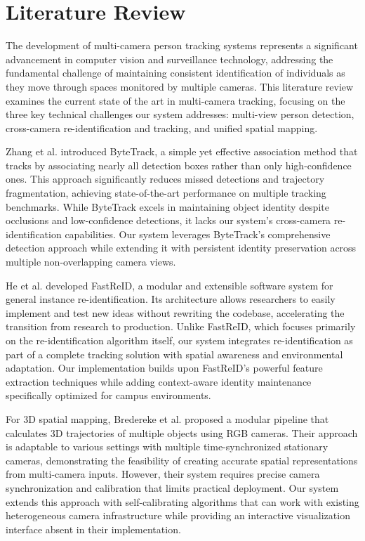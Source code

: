 \section{Literature Review}
\label{section:literature-review}

The development of multi-camera person tracking systems represents a significant advancement in computer vision and surveillance technology, addressing the fundamental challenge of maintaining consistent identification of individuals as they move through spaces monitored by multiple cameras. This literature review examines the current state of the art in multi-camera tracking, focusing on the three key technical challenges our system addresses: multi-view person detection, cross-camera re-identification and tracking, and unified spatial mapping.


Zhang et al. \cite{bytetrack} introduced ByteTrack, a simple yet effective association method that tracks by associating nearly all detection boxes rather than only high-confidence ones. This approach significantly reduces missed detections and trajectory fragmentation, achieving state-of-the-art performance on multiple tracking benchmarks. While ByteTrack excels in maintaining object identity despite occlusions and low-confidence detections, it lacks our system's cross-camera re-identification capabilities. Our system leverages ByteTrack's comprehensive detection approach while extending it with persistent identity preservation across multiple non-overlapping camera views.


He et al. \cite{fastreid} developed FastReID, a modular and extensible software system for general instance re-identification. Its architecture allows researchers to easily implement and test new ideas without rewriting the codebase, accelerating the transition from research to production. Unlike FastReID, which focuses primarily on the re-identification algorithm itself, our system integrates re-identification as part of a complete tracking solution with spatial awareness and environmental adaptation. Our implementation builds upon FastReID's powerful feature extraction techniques while adding context-aware identity maintenance specifically optimized for campus environments.


For 3D spatial mapping, Bredereke et al. \cite{modular3d} proposed a modular pipeline that calculates 3D trajectories of multiple objects using RGB cameras. Their approach is adaptable to various settings with multiple time-synchronized stationary cameras, demonstrating the feasibility of creating accurate spatial representations from multi-camera inputs. However, their system requires precise camera synchronization and calibration that limits practical deployment. Our system extends this approach with self-calibrating algorithms that can work with existing heterogeneous camera infrastructure while providing an interactive visualization interface absent in their implementation.


